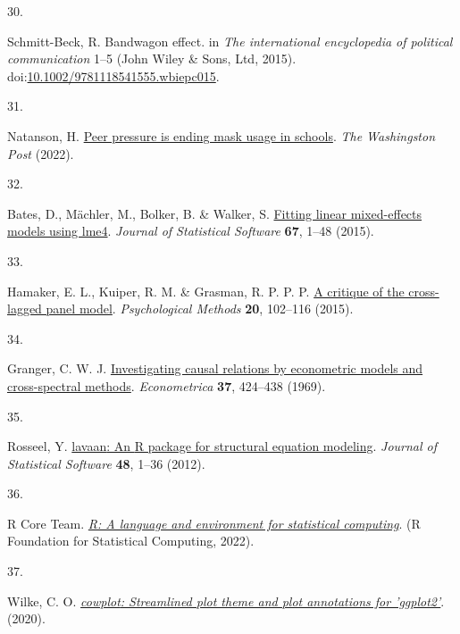 \documentclass[
  man, donotrepeattitle,floatsintext]{apa6}
\newlength{\cslhangindent}
\newlength{\csllabelwidth}
\newlength{\cslentryspacingunit} %
\newenvironment{CSLReferences}[2] %
 {%
  \setlength{\parindent}{0pt}
  \ifodd #1
  \let\oldpar\par
  \def\par{\hangindent=\cslhangindent\oldpar}
  \fi
  \setlength{\parskip}{#2\cslentryspacingunit}
 }%
 {}
\newcommand{\CSLLeftMargin}[1]{\parbox[t]{\csllabelwidth}{#1}}
\newcommand{\CSLRightInline}[1]{\parbox[t]{\linewidth - \csllabelwidth}{#1}\break}
\begin{document}
\begin{CSLReferences}{0}{0}
\leavevmode{}%
\CSLLeftMargin{30. }%
\CSLRightInline{Schmitt-Beck, R. Bandwagon effect. in \emph{The international encyclopedia of political communication} 1--5 (John Wiley \& Sons, Ltd, 2015). doi:\href{https://doi.org/10.1002/9781118541555.wbiepc015}{10.1002/9781118541555.wbiepc015}.}

\leavevmode{}%
\CSLLeftMargin{31. }%
\CSLRightInline{Natanson, H. \href{https://www.washingtonpost.com/education/2022/02/25/peer-pressure-mask-optional-schools/}{Peer pressure is ending mask usage in schools}. \emph{The Washingston Post} (2022).}

\leavevmode{}%
\CSLLeftMargin{32. }%
\CSLRightInline{Bates, D., Mächler, M., Bolker, B. \& Walker, S. \href{https://doi.org/10.18637/jss.v067.i01}{Fitting linear mixed-effects models using lme4}. \emph{Journal of Statistical Software} \textbf{67}, 1--48 (2015).}

\leavevmode{}%
\CSLLeftMargin{33. }%
\CSLRightInline{Hamaker, E. L., Kuiper, R. M. \& Grasman, R. P. P. P. \href{https://doi.org/10.1037/a0038889}{A critique of the cross-lagged panel model}. \emph{Psychological Methods} \textbf{20}, 102--116 (2015).}

\leavevmode{}%
\CSLLeftMargin{34. }%
\CSLRightInline{Granger, C. W. J. \href{https://doi.org/10.2307/1912791}{Investigating causal relations by econometric models and cross-spectral methods}. \emph{Econometrica} \textbf{37}, 424--438 (1969).}

\leavevmode{}%
\CSLLeftMargin{35. }%
\CSLRightInline{Rosseel, Y. \href{https://doi.org/10.18637/jss.v048.i02}{{lavaan}: An {R} package for structural equation modeling}. \emph{Journal of Statistical Software} \textbf{48}, 1--36 (2012).}

\leavevmode{}%
\CSLLeftMargin{36. }%
\CSLRightInline{R Core Team. \emph{\href{https://www.R-project.org/}{R: A language and environment for statistical computing}}. (R Foundation for Statistical Computing, 2022).}

\leavevmode{}%
\CSLLeftMargin{37. }%
\CSLRightInline{Wilke, C. O. \emph{\href{https://CRAN.R-project.org/package=cowplot}{{cowplot}: Streamlined plot theme and plot annotations for 'ggplot2'}}. (2020).}


\end{CSLReferences}
\end{document}
